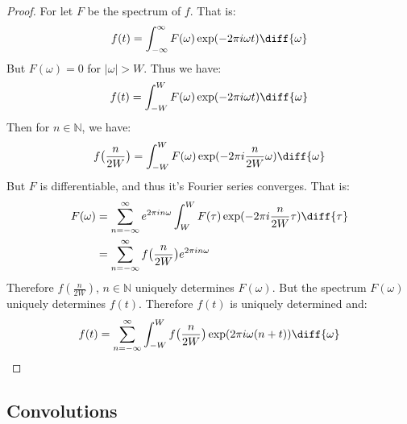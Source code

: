 \documentclass[crop=false,class=book,oneside]{standalone}
\begin{document}
            \begin{proof}
                For let $F$ be the spectrum of $f$. That is:
                \begin{equation}
                    f(t)=\int_{-\infty}^{\infty}F(\omega)
                    \exp(-2\pi{i}\omega{t})\diff{\omega}
                \end{equation}
                But $F(\omega)=0$ for $|\omega|>W$. Thus we have:
                \begin{equation}
                    f(t)=\int_{-W}^{W}F(\omega)
                    \exp(-2\pi{i}\omega{t})\diff{\omega}
                \end{equation}
                Then for $n\in\mathbb{N}$, we have:
                \begin{equation}
                    f\big(\frac{n}{2W}\big)=\int_{-W}^{W}F(\omega)
                    \exp(-2\pi{i}\frac{n}{2W}\omega)\diff{\omega}
                \end{equation}
                But $F$ is differentiable, and thus it's Fourier
                series converges. That is:
                \begin{subequations}
                    \begin{align}
                        F(\omega)
                        &=\sum_{n=-\infty}^{\infty}e^{2\pi{i}n\omega}
                        \int_{W}^{W}F(\tau)
                        \exp(-2\pi{i}\frac{n}{2W}\tau)\diff{\tau}\\
                        &=\sum_{n=-\infty}^{\infty}f
                          \big(\frac{n}{2W}\big)e^{2\pi{i}n\omega}
                    \end{align}
                \end{subequations}
                Therefore $f(\frac{n}{2W})$, $n\in \mathbb{N}$
                uniquely determines $F(\omega)$. But the
                spectrum $F(\omega)$ uniquely determines
                $f(t)$. Therefore $f(t)$ is
                uniquely determined and:
                \begin{equation}
                    f(t)=\sum_{n=-\infty}^{\infty}\int_{-W}^{W}
                    f\big(\frac{n}{2W}\big)
                    \exp(2\pi{i}\omega(n+t))\diff{\omega}
                \end{equation}
            \end{proof}
        \subsection{Convolutions}
\end{document}
